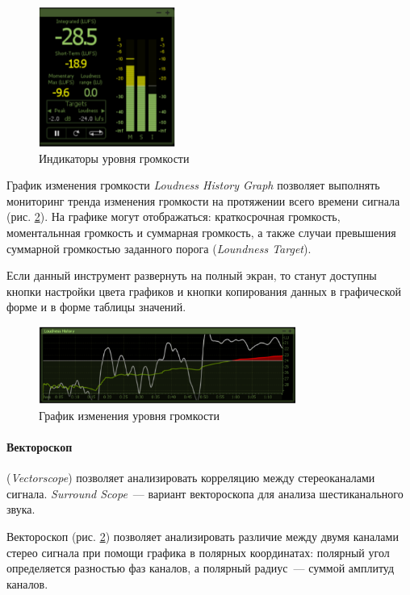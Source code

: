 \documentclass[oneside, final, 14pt]{extreport}
\begin{document}
\begin{figure}[h!]
\centering
\includegraphics[width=0.4\textwidth]{pic-insight-07}
\caption{Индикаторы уровня громкости}
\label{pic-insight-07}
\end{figure}

График изменения громкости \textit{Loudness History Graph} позволяет выполнять мониторинг 
тренда изменения громкости на протяжении всего времени сигнала (рис. \ref{pic-insight-08}). На графике могут отображаться: краткосрочная громкость, моментальнная громкость и суммарная громкость, а также случаи превышения суммарной громкостью заданного порога (\textit{Loundness Target}).

Если данный инструмент развернуть на полный экран, то станут доступны кнопки настройки цвета графиков и кнопки копирования данных в графической форме и в форме таблицы значений.

\begin{figure}[h!]
\centering
\includegraphics[width=0.75\textwidth]{pic-insight-08}
\caption{График изменения уровня громкости}
\label{pic-insight-08}
\end{figure}

\paragraph{Вектороскоп} (\textit{Vectorscope}) позволяет анализировать корреляцию между стереоканалами сигнала. \textit{Surround Scope}~--- вариант вектороскопа для анализа шестиканального звука.

Вектороскоп (рис. \ref{pic-insight-08}) позволяет анализировать различие между двумя каналами стерео сигнала при помощи графика в полярных координатах: полярный угол определяется разностью фаз каналов, а полярный радиус~--- суммой амплитуд каналов.  
\end{document}
